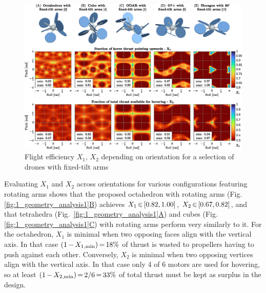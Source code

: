 \documentclass[conference]{IEEEtran}
\newcommand{\mcomp}{\thinmuskip=3mu\medmuskip=3mu\thickmuskip=3mu}
\begin{document}
\par
\begin{figure}[t!]
	\includegraphics[width=\textwidth]{img/1_geometry_analysis2.eps}
	\centering
	\caption{Flight efficiency $X_1$, $X_2$ depending on orientation for a selection of drones with fixed-tilt arms}
	\label{fig:1_geometry_analysis2}
	\vspace{-4pt}
\end{figure}
\par
Evaluating $X_1$ and $X_2$ across orientations for various configurations featuring rotating arms shows that the proposed octahedron with rotating arms (Fig. \hyperref[fig:1_geometry_analysis1]{\ref*{fig:1_geometry_analysis1}B}) achieves $\mcomp X_1\in[0.82,1.00]$, $\mcomp X_2\in[0.67,0.82]$, and that tetrahedra \mbox{(Fig. \hyperref[fig:1_geometry_analysis1]{\ref*{fig:1_geometry_analysis1}A})} and cubes (Fig. \hyperref[fig:1_geometry_analysis1]{\ref*{fig:1_geometry_analysis1}C}) with rotating arms perform very similarly to it. For the octahedron, $X_1$ is minimal when two opposing faces align with the vertical axis. In that case $\mcomp (1-X_{1, \mathrm{min}})=18\%$ of thrust is wasted to propellers having to push against each other. Conversely, $X_2$ is minimal when two opposing vertices align with the vertical axis. In that case only 4 of 6 motors are used for hovering, so at least $\mcomp (1-X_{2, \mathrm{min}})=2/6=33\%$ of total thrust must be kept as surplus in the design.
\par
\end{document}
